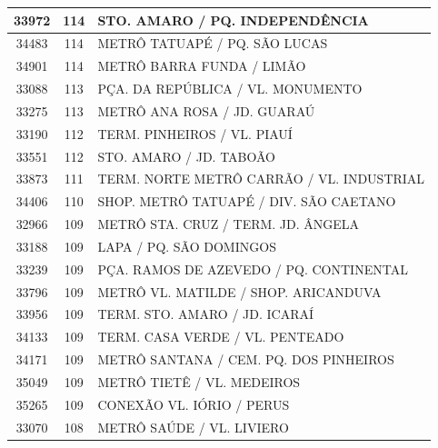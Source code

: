 \documentclass[
	12pt,				%
	oneside,			%
	a4paper,			%
	english,			%
	brazil				%
	]{abntex2ppgsi}
\begin{document}
\begin{apendicesenv}
\begin{longtable}{c|c|p{7cm}}
    33972 & 114   & STO. AMARO / PQ. INDEPENDÊNCIA \\
\hline

    34483 & 114   & METRÔ TATUAPÉ / PQ. SÃO LUCAS \\
\hline

    34901 & 114   & METRÔ BARRA FUNDA / LIMÃO \\
\hline

    33088 & 113   & PÇA. DA REPÚBLICA / VL. MONUMENTO \\
\hline

    33275 & 113   & METRÔ ANA ROSA / JD. GUARAÚ \\
\hline

    33190 & 112   & TERM. PINHEIROS / VL. PIAUÍ \\
\hline

    33551 & 112   & STO. AMARO / JD. TABOÃO \\
\hline

    33873 & 111   & TERM. NORTE METRÔ CARRÃO / VL. INDUSTRIAL \\
\hline

    34406 & 110   & SHOP. METRÔ TATUAPÉ / DIV. SÃO CAETANO \\
\hline

    32966 & 109   & METRÔ STA. CRUZ / TERM. JD. ÂNGELA \\
\hline

    33188 & 109   & LAPA / PQ. SÃO DOMINGOS \\
\hline

    33239 & 109   & PÇA. RAMOS DE AZEVEDO / PQ. CONTINENTAL \\
\hline

    33796 & 109   & METRÔ VL. MATILDE / SHOP. ARICANDUVA \\
\hline

    33956 & 109   & TERM. STO. AMARO / JD. ICARAÍ \\
\hline

    34133 & 109   & TERM. CASA VERDE / VL. PENTEADO \\
\hline

    34171 & 109   & METRÔ SANTANA / CEM. PQ. DOS PINHEIROS \\
\hline

    35049 & 109   & METRÔ TIETÊ / VL. MEDEIROS \\
\hline

    35265 & 109   & CONEXÃO VL. IÓRIO  / PERUS \\
\hline

    33070 & 108   & METRÔ SAÚDE / VL. LIVIERO \\
\hline


\end{longtable}
\end{apendicesenv}
\end{document}
